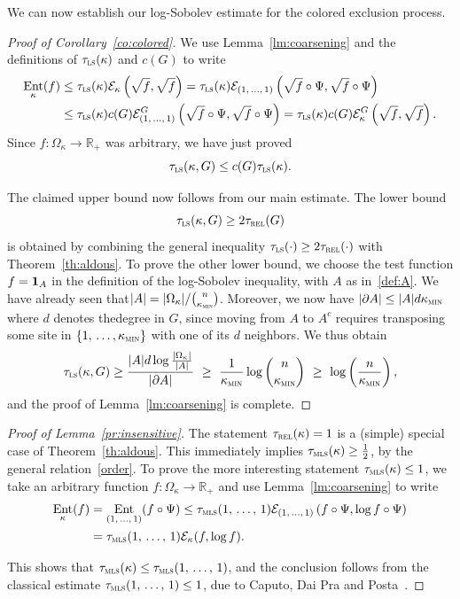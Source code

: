 \documentclass[10pt]{amsart}
\theoremstyle{definition}\newtheorem{defi}[theo]{Definition}\newtheorem{rema}[theo]{Remark}\newtheorem{exam}[theo]{Example}\newtheorem{exem}[theo]{Example}\newtheorem{nota}[theo]{Notation}
\newcommand{\R}{\mathbb{R}}
\newcommand{\cE}{\mathcal{E}}
\newcommand{\trel}{\tau_{\textsc{rel}}}
\newcommand{\tmls}{\tau_{\textsc{mls}}}
\newcommand{\tls}{\tau_{\textsc{ls}}}
\newcommand{\am}{{\kappa_{\textsc{min}}}}
\newcommand{\bfun}{\bf 1}
\DeclareMathOperator{\ent}{Ent}
\begin{document}
We can now establish our log-Sobolev estimate for the colored exclusion process.

\begin{proof}[Proof of Corollary~\ref{co:colored}]We use Lemma~\ref{lm:coarsening} and the definitions of $\tls(\kappa)$ and $c(G)$ to write
\begin{align*}
\ent_\kappa(f)
& \le \tls(\kappa)\cE_\kappa\left(\sqrt{f},\sqrt{f}\right)
= \tls(\kappa)\cE_{(1,\,\ldots,\,1)}\left(\sqrt{f}\circ\Psi,\sqrt{f}\circ\Psi\right)\\
& \le \tls(\kappa)c(G)\cE_{(1,\,\ldots,\,1)}^G\left(\sqrt{f}\circ\Psi,\sqrt{f}\circ\Psi\right)
= \tls(\kappa)c(G)\cE_{\kappa}^G\left(\sqrt{f},\sqrt{f}\right).
\end{align*}
Since $f\colon\Omega_\kappa\to\R_+$ was arbitrary, we have just proved
\[
\tls(\kappa,G) \le c(G)\tls(\kappa).
\]

The claimed upper bound now follows from our main estimate. The lower bound
\[
\tls(\kappa,G) \ge 2\trel(G)
\]
is obtained by combining the general inequality $\tls(\cdot)\ge 2\trel(\cdot)$ with Theorem~\ref{th:aldous}. To prove the other lower bound, we choose the test function $f={\bfun}_A$ in the definition of the log-Sobolev inequality, with $A$ as in~\eqref{def:A}. We have already seen that\linebreak$|A|=|\Omega_\kappa|/\binom{n}{\am}$. Moreover, we now have $|\partial A|\le |A|d\am$ where $d$ denotes the\linebreak degree in $G$, since moving from $A$ to $A^c$ requires transposing some site in $\{1,\,\ldots,\linebreak\am\}$ with one of its $d$ neighbors. We thus obtain
\[
\tls(\kappa,G) \ge \frac{|A|d\log\frac{|\Omega_\kappa|}{|A|}}{|\partial A|} \ \ge \ \frac{1}{\am}\log \binom{n}{\am} \ \ge \ \log\left({\frac n\am}\right),
\]
and the proof of Lemma~\ref{lm:coarsening} is complete.
\end{proof}


\begin{proof}[Proof of Lemma~\ref{pr:insensitive}]The statement $\trel(\kappa)=1$ is a (simple) special case of Theorem~\ref{th:aldous}. This immediately implies $\tmls(\kappa)\ge \frac 12$, by the general relation~\eqref{order}. To prove the more interesting statement $\tmls(\kappa)\le 1$, we take an arbitrary function $f\colon\Omega_\kappa\to\R_+$ and use Lemma~\ref{lm:coarsening} to write
\begin{align*}
\ent_\kappa(f)
& = \ent_{(1,\,\ldots,\,1)}(f\circ\Psi)\le \tmls(1,\,\ldots,\,1)\cE_{(1,\,\ldots,\,1)}\left(f\circ\Psi,\log f\circ\Psi\right)\\
& = \tmls(1,\,\ldots,\,1)\cE_{\kappa}(f,\log f).
\end{align*}

This shows that $\tmls(\kappa)\le\tmls(1,\,\ldots,\,1)$, and the conclusion follows from the classical estimate $\tmls(1,\,\ldots,\,1)\le 1$, due to Caputo, Dai Pra and Posta~\cite[Theorem~5.1]{MR2548501}.
\end{proof}
\end{document}
